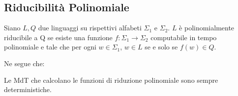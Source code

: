 \subsection{Riducibilità Polinomiale}

\begin{defn}
	Siano $L, Q$ due linguaggi su rispettivi alfabeti $\Sigma_1$ e $\Sigma_2$. $L$ è polinomialmente riducibile a Q se esiste una funzione $f : \Sigma_1 \rightarrow \Sigma_2$ computabile in tempo polinomiale e tale che per ogni $w \in \Sigma_1$, $w \in L$ se e solo se $f(w) \in Q$.
\end{defn}

Ne segue che: \\

\begin{remark}
	Le MdT che calcolano le funzioni di riduzione polinomiale sono sempre deterministiche.
\end{remark}
